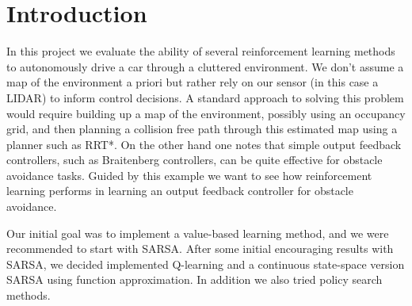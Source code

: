 \documentclass{article}
\begin{document}
 





\section{Introduction}
In this project we evaluate the ability of several reinforcement learning methods to autonomously drive a car through a cluttered environment. We don't assume a map of the environment a priori but rather rely on our sensor (in this case a LIDAR) to inform control decisions. A standard approach to solving this problem would require building up a map of the environment, possibly using an occupancy grid, and then planning a collision free path through this estimated map using a planner such as RRT*. On the other hand one notes that simple output feedback controllers, such as Braitenberg controllers, can be quite effective for obstacle avoidance tasks. Guided by this example we want to see how reinforcement learning performs in learning an output feedback controller for obstacle avoidance.

Our initial goal was to implement a value-based learning method, and we were recommended to start with SARSA.  After some initial encouraging results with SARSA, we decided implemented Q-learning and a continuous state-space version SARSA using function approximation. In addition we also tried policy search methods. 
\end{document}

